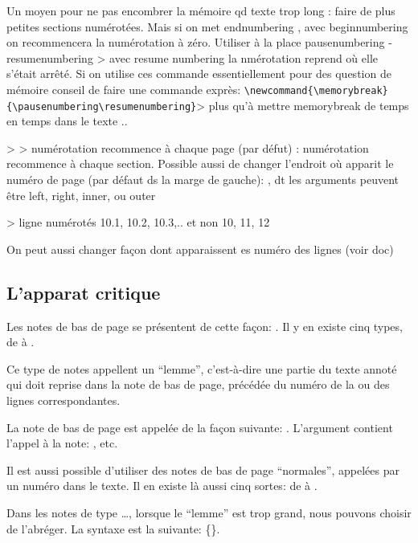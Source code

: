 Un moyen pour ne pas encombrer la mémoire qd texte trop long : faire de plus petites sections numérotées. Mais si on met endnumbering ,  avec beginnumbering on recommencera la numérotation à zéro.  Utiliser à la place pausenumbering - resumenumbering > avec resume numbering la nmérotation reprend où elle s'était arrêté. Si on utilise ces commande essentiellement pour des question de mémoire conseil de faire une commande exprès: \verb|\newcommand{\memorybreak}{\pausenumbering\resumenumbering}|> plus qu'à mettre memorybreak de temps en temps dans le texte ..

 >  > numérotation recommence à chaque page  (par défut) : numérotation recommence à chaque section.
Possible aussi de changer l'endroit où apparit le numéro de page (par défaut ds la marge de gauche): , dt les arguments peuvent être left, right, inner, ou outer

  > ligne numérotés 10.1, 10.2, 10.3,.. et non 10, 11, 12 

On peut aussi changer façon dont apparaissent es numéro des lignes (voir doc)



\subsection{L'apparat critique}

Les notes de bas de page se présentent de cette façon:  . Il y en existe cinq types, de  à .


Ce type de notes appellent un \enquote{lemme}, c'est-à-dire une partie du texte annoté qui doit reprise dans la note de bas de page, précédée du numéro de la ou des lignes correspondantes. 

La note de bas de page est appelée de la façon suivante:  . L'argument  contient l'appel à la note: ,  etc.

Il est aussi possible d'utiliser  des  notes de bas de page \enquote{normales}, appelées par un numéro dans le texte. Il  en existe là aussi cinq sortes: de  à .

Dans les notes de type \dots, lorsque le \enquote{lemme} est trop grand, nous pouvons choisir de l'abréger. La syntaxe est la suivante: 
\{\}. 

